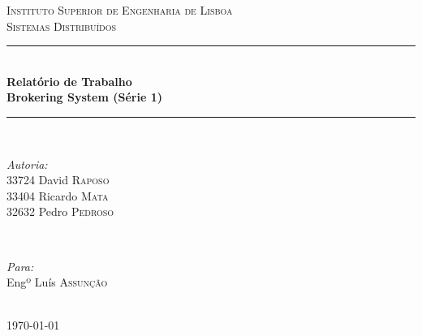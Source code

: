 \documentclass[a4paper]{article}
\begin{document}
\begin{titlepage}

\newcommand{\HRule}{\rule{\linewidth}{0.5mm}} %

\center %
 

\textsc{\LARGE Instituto Superior de Engenharia de Lisboa}\\[1.5cm] %
\textsc{\Large Sistemas Distribuídos}\\[0.5cm] %


\HRule \\[0.4cm]
{ \huge \bfseries Relatório de Trabalho}\\[0.4cm] %
{ \Large \bfseries Brokering System (Série 1)}\\
\HRule \\[1.5cm]
 

\begin{minipage}{0.4\textwidth}
\begin{flushleft} \large
\emph{Autoria:}\\
33724 David \textsc{Raposo} \\
33404 Ricardo \textsc{Mata} \\
32632 Pedro \textsc{Pedroso} \\
\end{flushleft}
\end{minipage}
~
\begin{minipage}{0.4\textwidth}
\begin{flushright} \large
\emph{Para:} \\
Engº Luís \textsc{Assunção} \\
\end{flushright}
\end{minipage}\\[4cm]

{\large \today}\\[3cm] %

\vfill %

\end{titlepage}
\end{document}

